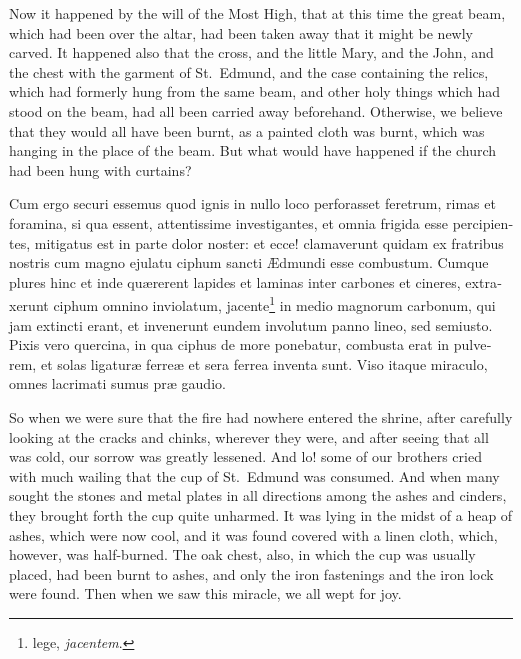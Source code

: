 \documentclass[10pt]{book}
\begin{document}
\begin{paracol}{2}
\switchcolumn

Now it happened by the will of the Most High, that at this time the great beam, which had been over the altar, had been taken away that it might be newly carved. It happened also that the cross, and the little Mary, and the John, and the chest with the garment of St.\ Edmund, and the case containing the relics, which had formerly hung from the same beam, and other holy things which had stood on the beam, had all been carried away beforehand. Otherwise, we believe that they would all have been burnt, as a painted cloth was burnt, which was hanging in the place of the beam. But what would have happened if the church had been hung with curtains?

\switchcolumn*

\begin{otherlanguage}{latin}
Cum ergo securi essemus quod ignis in nullo loco perforasset feretrum, rimas et foramina, si qua essent, attentissime investigantes, et omnia frigida esse percipientes, mitigatus est in parte dolor noster: et ecce! clamaverunt quidam ex fratribus nostris cum magno ejulatu ciphum sancti \AE{}dmundi esse combustum. Cumque plures hinc et inde qu\ae{}rerent lapides et laminas inter carbones et cineres, extraxerunt ciphum omnino inviolatum, jacente\footnote[\textdagger]{lege, \emph{jacentem}.} in medio magnorum carbonum, qui jam extincti erant, et invenerunt eundem involutum panno lineo, sed semiusto. Pixis vero quercina, in qua ciphus de more ponebatur, combusta erat in pulverem, et solas ligatur\ae{} ferre\ae{} et sera ferrea inventa sunt. Viso itaque miraculo, omnes lacrimati sumus pr\ae{} gaudio. 
\end{otherlanguage}

\switchcolumn

So when we were sure that the fire had nowhere entered the shrine, after carefully looking at the cracks and chinks, wherever they were, and after seeing that all was cold, our sorrow was greatly lessened. And lo! some of our brothers cried with much wailing that the cup of St.\ Edmund was consumed. And when many sought the stones and metal plates in all directions among the ashes and cinders, they brought forth the cup quite unharmed. It was lying in the midst of a heap of ashes, which were now cool, and it was found covered with a linen cloth, which, however, was half-burned. The oak chest, also, in which the cup was usually placed, had been burnt to ashes, and only the iron fastenings and the iron lock were found. Then when we saw this miracle, we all wept for joy.


\end{paracol}
\end{document}

